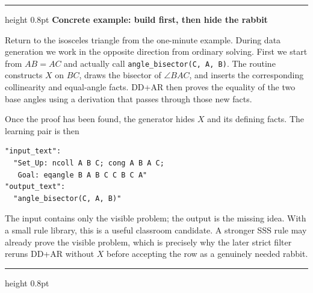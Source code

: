 \documentclass[reqno]{amsart}
\newenvironment{lecturebox}[1]{%
    \par\medskip
    \noindent\begingroup
    \setlength{\parindent}{0pt}
    \color{agblue}\hrule height 0.8pt\color{black}
    \smallskip
    \textbf{\color{agblue}#1}\par\smallskip
}{%
    \smallskip
    \color{agblue}\hrule height 0.8pt\color{black}
    \endgroup
    \medskip
}
\DeclareMathOperator{\1}{\textbf{1}}
\begin{document}
\begin{lecturebox}{Concrete example: build first, then hide the rabbit}
Return to the isosceles triangle from the one-minute example. During data
generation we work in the opposite direction from ordinary solving. First we
start from $AB=AC$ and actually call
\verb|angle_bisector(C, A, B)|. The routine constructs $X$ on $BC$, draws the
bisector of $\angle BAC$, and inserts the corresponding collinearity and
equal-angle facts. DD+AR then proves the equality of the two base angles using
a derivation that passes through those new facts.

\begin{center}
\end{center}

Once the proof has been found, the generator hides $X$ and its defining
facts. The learning pair is then
\begin{lstlisting}
"input_text":
  "Set_Up: ncoll A B C; cong A B A C;
   Goal: eqangle B A B C C B C A"
"output_text":
  "angle_bisector(C, A, B)"
\end{lstlisting}
The input contains only the visible problem; the output is the missing idea.
With a small rule library, this is a useful classroom candidate. A stronger
SSS rule may already prove the visible problem, which is precisely why the
later strict filter reruns DD+AR without $X$ before accepting the row as a
genuinely needed rabbit.
\end{lecturebox}
\end{document}
